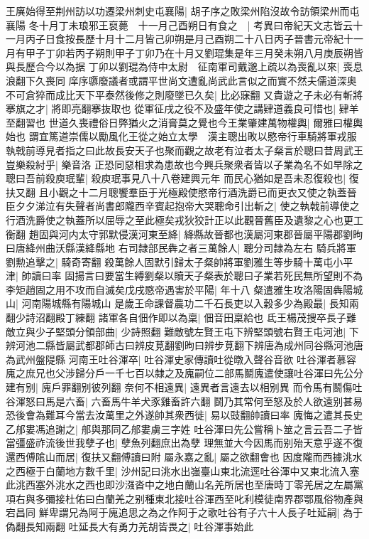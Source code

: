 王廙始得至荆州訪以功遷梁州刺史屯襄陽|{
	胡子序之敗梁州陷沒故令訪領梁州而屯襄陽}
冬十月丁未琅邪王裒薨　十一月己酉朔日有食之　|{
	考異曰帝紀天文志皆云十一月丙子日食按長歷十月十二月皆己卯朔是月己酉朔二十八日丙子晉書元帝紀十一月有甲子丁卯若丙子朔則甲子丁卯乃在十月又劉琨集是年三月癸未朔八月庚辰朔皆與長歷合今以為据}
丁卯以劉琨為侍中太尉　征南軍司戴邈上疏以為喪亂以來|{
	喪息浪翻下久喪同}
庠序隳廢議者或謂平世尚文遭亂尚武此言似之而實不然夫儒道深奥不可倉猝而成比天下平泰然後修之則廢墜已久矣|{
	比必寐翻}
又貴遊之子未必有斬將搴旗之才|{
	將即亮翻搴抜取也}
從軍征戌之役不及盛年使之講肄道義良可惜也|{
	肄羊至翻習也}
世道久喪禮俗日弊猶火之消膏莫之覺也今王業肇建萬物權輿|{
	爾雅曰權輿始也}
謂宜篤道崇儒以勵風化王從之始立太學　漢主聰出畋以愍帝行車騎將軍戎服執戟前導見者指之曰此故長安天子也聚而觀之故老有泣者太子粲言於聰曰昔周武王豈樂殺紂乎|{
	樂音洛}
正恐同惡相求為患故也今興兵聚衆者皆以子業為名不如早除之聰曰吾前殺庾珉輩|{
	殺庾珉事見八十八卷建興元年}
而民心猶如是吾未忍復殺也|{
	復扶又翻}
且小觀之十二月聰饗羣臣于光極殿使愍帝行酒洗爵已而更衣又使之執蓋晉臣夕夕涕泣有失聲者尚書郎隴西辛賓起抱帝大哭聰命引出斬之|{
	使之執戟前導使之行酒洗爵使之執蓋所以屈辱之至此極矣戎狄狡計正以此觀晉舊臣及遺黎之心也更工衡翻}
趙固與河内太守郭默侵漢河東至絳|{
	絳縣故晉都也漢屬河東郡晉屬平陽郡劉昫曰唐絳州曲沃縣漢絳縣地}
右司隸部民犇之者三萬餘人|{
	聰分司隸為左右}
騎兵將軍劉勲追擊之|{
	騎奇寄翻}
殺萬餘人固默引歸太子粲帥將軍劉雅生等步騎十萬屯小平津|{
	帥讀曰率}
固揚言曰要當生縛劉粲以贖天子粲表於聰曰子業若死民無所望則不為李矩趙固之用不攻而自滅矣戊戌愍帝遇害於平陽|{
	年十八}
粲遣雅生攻洛陽固犇陽城山|{
	河南陽城縣有陽城山}
是歲王命課督農功二千石長吏以入穀多少為殿最|{
	長知兩翻少詩沼翻殿丁練翻}
諸軍各自佃作即以為稟|{
	佃音田稟給也}
氐王楊茂搜卒長子難敵立與少子堅頭分領部曲|{
	少詩照翻}
難敵號左賢王屯下辨堅頭號右賢王屯河池|{
	下辨河池二縣皆屬武都郡師古曰辨皮莧翻劉昫曰辨步莧翻下辨唐為成州同谷縣河池唐為武州盤隄縣}
河南王吐谷渾卒|{
	吐谷渾史家傳讀吐從暾入聲谷音欲}
吐谷渾者慕容廆之庶兄也父涉歸分戶一千七百以隸之及廆嗣位二部馬鬬廆遣使讓吐谷渾曰先公分建有别|{
	廆戶罪翻别彼列翻}
奈何不相遠異|{
	遠異者言遠去以相别異}
而令馬有鬭傷吐谷渾怒曰馬是六畜|{
	六畜馬牛羊犬豕雞畜許六翻}
鬬乃其常何至怒及於人欲遠别甚易恐後會為難耳今當去汝萬里之外遂帥其衆西徙|{
	易以豉翻帥讀曰率}
廆悔之遣其長史乙郍婁馮追謝之|{
	郍與那同乙郍婁虜三字姓}
吐谷渾曰先公嘗稱卜筮之言云吾二子皆當彊盛祚流後世我孽子也|{
	孽魚列翻庶出為孽}
理無並大今因馬而别殆天意乎遂不復還西傅隂山而居|{
	復扶又翻傅讀曰附}
屬永嘉之亂|{
	屬之欲翻會也}
因度隴而西據洮水之西極于白蘭地方數千里|{
	沙州記曰洮水出嵹臺山東北流逕吐谷渾中又東北流入塞此洮西塞外洮水之西也即沙漒沓中之地白蘭山名羌所居也至唐時丁零羌居之左屬黨項右與多彌接杜佑曰白蘭羌之别種東北接吐谷渾西至叱利模徒南界郡鄂風俗物產與宕昌同}
鮮卑謂兄為阿于廆追思之為之作阿于之歌吐谷有子六十人長子吐延嗣|{
	為于偽翻長知兩翻}
吐延長大有勇力羌胡皆畏之|{
	吐谷渾事始此}


